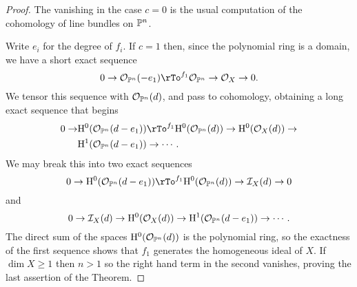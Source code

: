 \documentclass[12pt, leqno]{book}
\begin{document}
\begin{proof} The vanishing in the case $c=0$ is the usual computation of the cohomology of line bundles on ${\mathbb P}^{n}$.

Write $e_{i}$ for the degree of $f_{i}$. If $c = 1$ then, since the polynomial ring is a domain, we have a short exact sequence
$$
0\to \cO_{\PP^{n}}(-e_{1}) \rTo^{f_{1}}  \cO_{\PP^{n}} \to  \cO_{X}\to 0.
$$
We tensor this sequence with ${\mathcal O}_{{\mathbb P}^{n}}(d)$, and pass to cohomology, obtaining a long exact sequence that begins
\begin{align*}
0\to &\HH^{0}(\cO_{\PP^{n}}(d-e_{1})) \rTo^{f_{1}}  \HH^{0}(\cO_{\PP^{n}}(d)) \to  \HH^{0}(\cO_{X}(d))\to\\
&\HH^{1}(\cO_{\PP^{n}}(d-e_{1}))\to \cdots .
\end{align*}
We may break this into two exact sequences
$$
0\to \HH^{0}(\cO_{\PP^{n}}(d-e_{1})) \rTo^{f_{1}}  \HH^{0}(\cO_{\PP^{n}}(d)) \to \cI_{X}(d) \to 0
$$
and 
$$
0 \to {\mathcal I}_{X}(d) \to {\rm{H}}^{0}({\mathcal O}_{X}(d))\to{\rm{H}}^{1}({\mathcal O}_{{\mathbb P}^{n}}(d-e_{1}))\to \cdots .
$$ 
The direct sum of the spaces ${\rm{H}}^{0}({\mathcal O}_{{\mathbb P}^{n}}(d))$ is the polynomial ring, so the exactness of the first sequence shows that $f_{1}$ generates the homogeneous ideal of $X$. If $\dim X\geq 1$ then $n>1$ so the right hand term in the second  vanishes,
proving the last assertion of the Theorem.


\end{proof}
\end{document}
